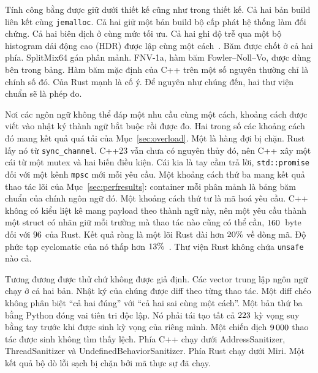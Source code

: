 Tính công bằng được giữ dưới thiết kế cũng như trong thiết kế. Cả hai bản build liên kết cùng
\texttt{jemalloc}. Cả hai giữ một bản build bộ cấp phát hệ thống làm đối chứng. Cả hai biên dịch
ở cùng mức tối ưu. Cả hai ghi độ trễ qua một bộ histogram dải động cao (HDR) được lập cùng một
cách~\cite{tene_hdrhistogram}. Băm được chốt ở cả hai phía. SplitMix64 gán phân mảnh. FNV-1a,
hàm băm Fowler--Noll--Vo, được dùng bên trong bảng. Hàm băm mặc định của C++ trên một số nguyên
thường chỉ là chính số đó. Của Rust mạnh là cố ý. Để nguyên như chúng đến, hai thư viện chuẩn
sẽ là phép đo.

Nơi các ngôn ngữ không thể đáp một nhu cầu cùng một cách, khoảng cách được viết vào nhật ký
thành ngữ bắt buộc rồi được đo. Hai trong số các khoảng cách đó mang kết quả quá tải của
Mục~\ref{sec:overload}. Một là hàng đợi bị chặn. Rust lấy nó từ \texttt{sync\_channel}. C++23
vẫn chưa có nguyên thủy đó, nên C++ xây một cái từ một mutex và hai biến điều kiện. Cái kia là
tay cầm trả lời, \texttt{std::promise} đối với một kênh \texttt{mpsc} mới mỗi yêu cầu. Một
khoảng cách thứ ba mang kết quả thao tác lõi của Mục~\ref{sec:perfresults}: container mỗi phân
mảnh là bảng băm chuẩn của chính ngôn ngữ đó. Một khoảng cách thứ tư là mã hoá yêu cầu. C++
không có kiểu liệt kê mang payload theo thành ngữ này, nên một yêu cầu thành một struct có nhãn
giữ mỗi trường mà thao tác nào cũng có thể cần, $160$~byte đối với
$96$ của Rust. Kết quả ròng là một lõi Rust dài hơn $20\%$ về dòng mã. Độ
phức tạp cyclomatic của nó thấp hơn $13\%$~\cite{lizard}. Thư viện Rust không chứa
\texttt{unsafe} nào cả.

Tương đương được thử chứ không được giả định. Các vector trung lập ngôn ngữ chạy ở cả hai bản.
Nhật ký của chúng được diff theo từng thao tác. Một diff chéo không phân biệt ``cả hai đúng''
với ``cả hai sai cùng một cách''. Một bản thứ ba bằng Python đóng vai tiên tri độc lập. Nó phải
tái tạo tất cả $223$ kỳ vọng suy bằng tay trước khi được sinh kỳ vọng của riêng mình.
Một chiến dịch $9\,000$ thao tác được sinh không tìm thấy lệch. Phía C++ chạy dưới
AddressSanitizer, ThreadSanitizer và UndefinedBehaviorSanitizer. Phía Rust chạy dưới Miri. Một
kết quả bộ dò lỗi sạch bị chặn bởi mã thực sự đã chạy.
